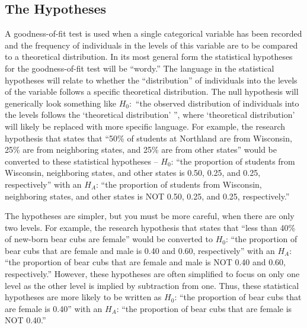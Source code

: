\documentclass[10pt,openany]{book}\usepackage[]{graphicx}\usepackage[]{color}
\begin{document}
\subsection{The Hypotheses}
A goodness-of-fit test is used when a single categorical variable has been recorded and the frequency of individuals in the levels of this variable are to be compared to a theoretical distribution.  In its most general form the statistical hypotheses for the goodness-of-fit test will be ``wordy.''  The language in the statistical hypotheses will relate to whether the ``distribution'' of individuals into the levels of the variable follows a specific theoretical distribution.  The null hypothesis will generically look something like $H_{0}:$ ``the observed distribution of individuals into the levels follows the `theoretical distribution' '', where `theoretical distribution' will likely be replaced with more specific language.  For example, the research hypothesis that states that ``50\% of students at Northland are from Wisconsin, 25\% are from neighboring states, and 25\% are from other states'' would be converted to these statistical hypotheses -- $H_{0}$: ``the proportion of students from Wisconsin, neighboring states, and other states is 0.50, 0.25, and 0.25, respectively'' with an $H_{A}$: ``the proportion of students from Wisconsin, neighboring states, and other states is NOT 0.50, 0.25, and 0.25, respectively.''


The hypotheses are simpler, but you must be more careful, when there are only two levels.  For example, the research hypothesis that states that ``less than 40\% of new-born bear cubs are female'' would be converted to $H_{0}$: ``the proportion of bear cubs that are female and male is 0.40 and 0.60, respectively'' with an $H_{A}$: ``the proportion of bear cubs that are female and male is NOT 0.40 and 0.60, respectively.''  However, these hypotheses are often simplified to focus on only one level as the other level is implied by subtraction from one.  Thus, these statistical hypotheses are more likely to be written as $H_{0}$: ``the proportion of bear cubs that are female is 0.40'' with an $H_{A}$: ``the proportion of bear cubs that are female is NOT 0.40.''

\end{document}
